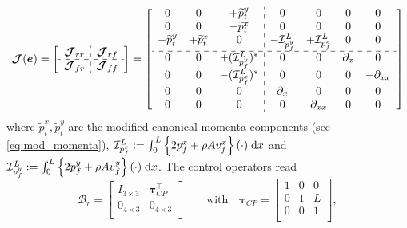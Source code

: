 \documentclass{svjour3}                     %
\begin{document}
\begin{equation}
\label{eq:EB_J}
\bm{\mathcal{J}}(\bm{e}) = 
\left[ \begin{array}{c:c}
\bm{\mathcal{J}}_{rr} & \bm{\mathcal{J}}_{rf} \\
\hdashline
\bm{\mathcal{J}}_{fr} & \bm{\mathcal{J}}_{ff} \\
\end{array} \right] = 
\left[ \begin{array}{ccc:cccc}
0 & 0 & +\widetilde{p}_t^y      & 0 & 0 & 0 & 0 \\
0 & 0 & -\widetilde{p}_t^x     & 0 & 0 & 0 & 0 \\
-\widetilde{p}_t^y & +\widetilde{p}_t^x & 0 & -\mathcal{I}_{p_f^y}^{L} & +\mathcal{I}_{p_f^x}^{L} & 0 & 0 \\
\hdashline 
0 & 0 & +(\mathcal{I}_{p_f^y}^{L})^* & 0 & 0 & \partial_x & 0  \\
0 & 0 & -(\mathcal{I}_{p_f^x}^{L})^* & 0 & 0 & 0 & -\partial_{xx} \\
0 & 0 & 0 & \partial_{x} & 0 & 0 & 0 \\
0 & 0 & 0 & 0 & \partial_{xx} & 0 & 0 \\
\end{array} \right]
\end{equation}
where $\widetilde{p}_t^x, \widetilde{p}_t^y$ are the modified canonical momenta components (see \eqref{eq:mod_momenta}), $\mathcal{I}_{p_f^x}^{L} := \int_{0}^{L} \left\{2 p_f^x + \rho A v_f^x \right\} (\cdot) \d{x}$ and $\mathcal{I}_{p_f^y}^{L} := \int_{0}^{L} \left\{2 p_f^y + \rho A v_f^y \right\} (\cdot) \d{x}$. The control operators read
\begin{equation}
\bm{\mathcal{B}}_r = \begin{bmatrix}
I_{3\times 3} & \bm\tau_{CP}^\top \\
0_{4\times 3} & 0_{4\times 3} \\
\end{bmatrix} \qquad \text{with} \quad
\bm\tau_{CP} = \begin{bmatrix}
1 & 0 & 0 \\
0 & 1 & L \\
0 & 0 & 1 \\
\end{bmatrix},
\end{equation}
\end{document}
